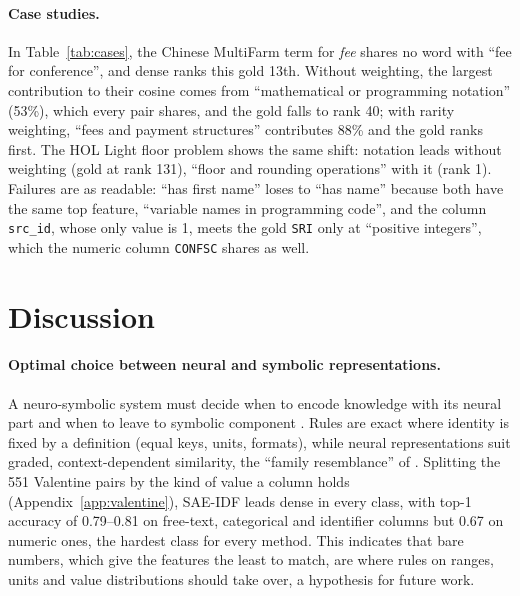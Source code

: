 \documentclass[11pt]{article}
\newcommand{\method}{SAE\mbox{-}IDF\xspace}
\begin{document}
\paragraph{Case studies.}
In Table~\ref{tab:cases}, the Chinese MultiFarm term for \emph{fee} shares no word with ``fee for conference'', and dense ranks this gold 13th.
Without weighting, the largest contribution to their cosine comes from ``mathematical or programming notation'' (53\%), which every pair shares, and the gold falls to rank 40; with rarity weighting, ``fees and payment structures'' contributes 88\% and the gold ranks first.
The HOL Light floor problem shows the same shift: notation leads without weighting (gold at rank 131), ``floor and rounding operations'' with it (rank 1).
Failures are as readable: ``has first name'' loses to ``has name'' because both have the same top feature, ``variable names in programming code'', and the column \texttt{src\_id}, whose only value is 1, meets the gold \texttt{SRI} only at ``positive integers'', which the numeric column \texttt{CONFSC} shares as well.

\section{Discussion}
\label{sec:discussion}

\paragraph{Optimal choice between neural and symbolic representations.}
A neuro-symbolic system must decide when to encode knowledge with its neural part and when to leave to symbolic component \citep{yang2026generative}. Rules are exact where identity is fixed by a definition (equal keys, units, formats), while neural representations suit graded, context-dependent similarity, the ``family resemblance'' of \citet{wittgenstein1953philosophical}.
Splitting the 551 Valentine pairs by the kind of value a column holds (Appendix~\ref{app:valentine}), \method leads dense in every class, with top-1 accuracy of 0.79--0.81 on free-text, categorical and identifier columns but 0.67 on numeric ones, the hardest class for every method.
This indicates that bare numbers, which give the features the least to match, are where rules on ranges, units and value distributions should take over, a hypothesis for future work.
\end{document}
